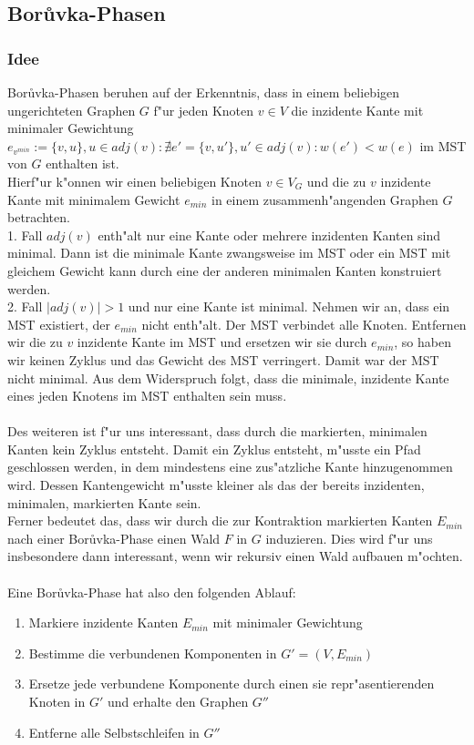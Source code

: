 \subsection{Bor\r uvka-Phasen}

\subsubsection{Idee}
\label{sec:borIdea}

Bor\r uvka-Phasen beruhen auf der Erkenntnis, dass in einem beliebigen 
    ungerichteten Graphen $G$ f"ur jeden Knoten $v \in V$ die inzidente Kante mit 
    minimaler Gewichtung 
    $e_{v^{min}} := \{v, u\}, u \in adj(v): 
        \nexists e' = \{v, u'\}, u' \in adj(v): w(e') < w(e)$
    im MST von $G$ enthalten ist.\\
Hierf"ur k"onnen wir einen beliebigen Knoten $v \in V_G$ und die zu $v$ inzidente
    Kante mit minimalem Gewicht $e_{min}$ in einem 
    zusammenh"angenden Graphen $G$ betrachten.\\
1. Fall $adj(v)$ enth"alt nur eine Kante oder mehrere inzidenten Kanten sind minimal. 
    Dann ist die minimale Kante zwangsweise im 
    MST oder ein MST mit gleichem Gewicht kann durch eine der anderen minimalen
    Kanten konstruiert werden.\\
2. Fall $|adj(v)| > 1$ und nur eine Kante ist minimal. 
    Nehmen wir an, dass ein MST existiert, der $e_{min}$ 
    nicht enth"alt. 
    Der MST verbindet alle Knoten.
    Entfernen wir die zu $v$ inzidente Kante im MST
    und ersetzen wir sie durch $e_{min}$, so haben wir keinen Zyklus und das
    Gewicht des MST verringert. 
    Damit war der MST nicht minimal.
    Aus dem Widerspruch folgt, dass die minimale, inzidente Kante eines jeden
    Knotens im MST enthalten sein muss.\\
\\
Des weiteren ist f"ur uns interessant, dass durch die markierten, minimalen
    Kanten kein Zyklus entsteht. 
    Damit ein Zyklus entsteht, m"usste ein Pfad geschlossen werden, 
    in dem mindestens eine zus"atzliche Kante hinzugenommen wird. 
    Dessen Kantengewicht m"usste kleiner als das der bereits inzidenten, 
    minimalen, markierten Kante sein.\\
Ferner bedeutet das, dass wir durch die zur Kontraktion markierten Kanten
    $E_{min}$ nach einer Bor\r uvka-Phase einen Wald $F$ in $G$ induzieren.
    Dies wird f"ur uns insbesondere dann interessant, wenn
    wir rekursiv einen Wald aufbauen m"ochten.\\
\\
Eine Bor\r uvka-Phase hat also den folgenden Ablauf:
\begin{enumerate}
    \item Markiere inzidente Kanten $E_{min}$ mit minimaler Gewichtung
    \item Bestimme die verbundenen Komponenten in $G' = (V,E_{min})$
    \item Ersetze jede verbundene Komponente durch einen sie repr"asentierenden
          Knoten in $G'$ und erhalte den Graphen $G''$
    \item Entferne alle Selbstschleifen in $G''$
\end{enumerate}

